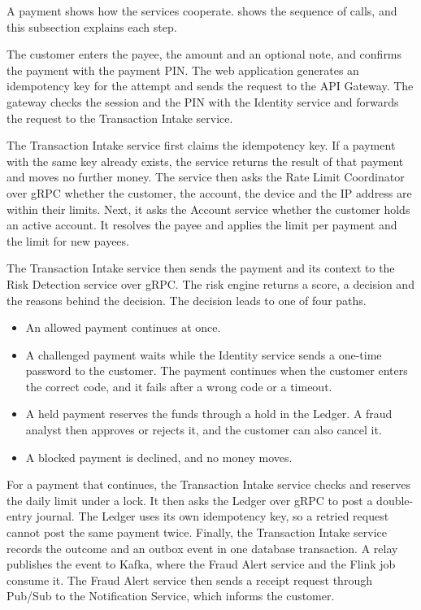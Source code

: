 \documentclass[11pt,a4paper]{article}
\begin{document}
A payment shows how the services cooperate.  shows the sequence of calls, and this subsection explains each step.

The customer enters the payee, the amount and an optional note, and confirms the payment with the payment PIN. The web application generates an idempotency key for the attempt and sends the request to the API Gateway. The gateway checks the session and the PIN with the Identity service and forwards the request to the Transaction Intake service.

The Transaction Intake service first claims the idempotency key. If a payment with the same key already exists, the service returns the result of that payment and moves no further money. The service then asks the Rate Limit Coordinator over gRPC whether the customer, the account, the device and the IP address are within their limits. Next, it asks the Account service whether the customer holds an active account. It resolves the payee and applies the limit per payment and the limit for new payees.

The Transaction Intake service then sends the payment and its context to the Risk Detection service over gRPC. The risk engine returns a score, a decision and the reasons behind the decision. The decision leads to one of four paths.
\begin{itemize}
\item An allowed payment continues at once.
\item A challenged payment waits while the Identity service sends a one-time password to the customer. The payment continues when the customer enters the correct code, and it fails after a wrong code or a timeout.
\item A held payment reserves the funds through a hold in the Ledger. A fraud analyst then approves or rejects it, and the customer can also cancel it.
\item A blocked payment is declined, and no money moves.
\end{itemize}

For a payment that continues, the Transaction Intake service checks and reserves the daily limit under a lock. It then asks the Ledger over gRPC to post a double-entry journal. The Ledger uses its own idempotency key, so a retried request cannot post the same payment twice. Finally, the Transaction Intake service records the outcome and an outbox event in one database transaction. A relay publishes the event to Kafka, where the Fraud Alert service and the Flink job consume it. The Fraud Alert service then sends a receipt request through Pub/Sub to the Notification Service, which informs the customer.
\end{document}
